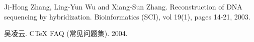 ﻿
\begin{publications}{99}

\item Ji-Hong Zhang, Ling-Yun Wu and Xiang-Sun Zhang.
  Reconstruction of DNA sequencing by hybridization.
  Bioinformatics (SCI), vol 19(1), pages 14-21, 2003.

\item 吴凌云.
  C\TeX{} FAQ (常见问题集).
  2004.

\end{publications}
